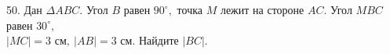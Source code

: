 50. Дан $\Delta ABC.$ Угол $B$ равен $90^\circ,$ точка $M$ лежит на стороне $AC.$ Угол  $MBC$ равен $30^\circ,$\\ $|MC|=3\text{ см},\ |AB|=3\text{ см}.$ Найдите $|BC|.$\\

